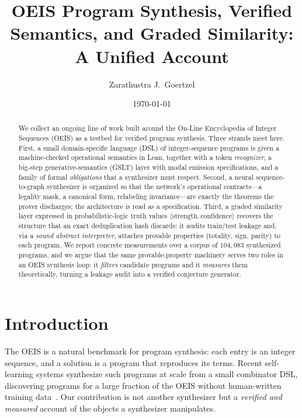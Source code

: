 \documentclass[11pt]{article}
\title{OEIS Program Synthesis, Verified Semantics, and Graded Similarity:\\
       A Unified Account}
\author{Zarathustra J.\ Goertzel}
\date{\today}
\begin{document}
\maketitle

\begin{abstract}
We collect an ongoing line of work built around the On-Line Encyclopedia of Integer
Sequences (OEIS) as a testbed for verified program synthesis. Three strands meet here.
First, a small domain-specific language (DSL) of integer-sequence programs is given a
machine-checked operational semantics in Lean, together with a token \emph{recognizer},
a big-step generative-semantics (GSLT) layer with modal emission specifications, and a
family of formal \emph{obligations} that a synthesizer must respect. Second, a neural
sequence-to-graph synthesizer is organized so that the network's operational
contracts---a legality mask, a canonical form, relabeling invariance---are exactly the
theorems the prover discharges; the architecture is read as a specification. Third, a
graded similarity layer expressed in probabilistic-logic truth values $\langle
\text{strength},\text{confidence}\rangle$ recovers the structure that an exact
deduplication hash discards: it audits train/test leakage and, via a \emph{sound abstract
interpreter}, attaches provable properties (totality, sign, parity) to each program. We
report concrete measurements over a corpus of $104{,}083$ synthesized programs, and we
argue that the same provable-property machinery serves two roles in an OEIS synthesis
loop: it \emph{filters} candidate programs and it \emph{measures} them theoretically,
turning a leakage audit into a verified conjecture generator.
\end{abstract}

\section{Introduction}

The OEIS is a natural benchmark for program synthesis: each entry is an integer sequence,
and a solution is a program that reproduces its terms. Recent self-learning systems
synthesize such programs at scale from a small combinator DSL, discovering programs for a
large fraction of the OEIS without human-written training
data~\cite{gauthier2023,gauthier2025}. Our contribution is not another synthesizer but a
\emph{verified and measured} account of the objects a synthesizer manipulates.
\end{document}
